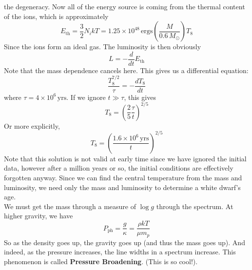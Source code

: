 \documentclass[10pt]{article}
\numberwithin{equation}{section}
\newcommand{\n}{\noindent}
\begin{document}
    the degeneracy. Now all of the energy source is coming from the
    thermal content of the ions, which is approximately
    \begin{equation}
      \label{eq:299}
      E_{\mathrm{th}}=\frac{3}{2}N_i k T=1.25\times 10^{48}\,\mathrm{ergs}\left(\frac{M}{0.6\,M_\odot}\right)T_8
    \end{equation}
    Since the ions form an ideal gas. The luminosity is then obviously
    \begin{equation}
      \label{eq:300}
      L=-\frac{d}{dt}E_{\mathrm{th}}
    \end{equation}
    Note that the mass dependence cancels here. This gives us a
    differential equation:
    \begin{equation}
      \label{eq:301}
      \frac{T_8^{7/2}}{\tau}=-\frac{dT_8}{dt}
    \end{equation}
    where $\tau=4\times 10^{6}\,\mathrm{yrs}$. If we ignore $t\gg
    \tau$, this gives
    \begin{equation}
      \label{eq:302}
      T_8=\left(\frac{2}{5}\frac{\tau}{t}\right)^{2/5}
    \end{equation}
    Or more explicitly,
    \begin{equation}
      \label{eq:303}
      T_8=\left(\frac{1.6\times 10^6\,\mathrm{yrs}}{t}\right)^{2/5}
    \end{equation}
    Note that this solution is not valid at early time since we have
    ignored the initial data, however after a million years or so, the
    initial conditions are effectively forgotten anyway. Since we can
    find the central temperature from the mass and luminosity, we need
    only the mass and luminosity to determine a white dwarf's age.\\

    \n We must get the mass through a measure of $\log g$ through the
    spectrum. At higher gravity, we have
    \begin{equation}
      P_{\mathrm{ph}}=\frac{g}{\kappa}=\frac{\rho kT}{\mu m_p}\label{eq:304}
    \end{equation}
    So as the density goes up, the gravity goes up (and thus the mass
    goes up). And indeed, as the
    pressure increases, the line widths in a spectrum increase. This
    phenomenon is called \textbf{Pressure Broadening}. (This is so
    cool!). \\
\end{document}

